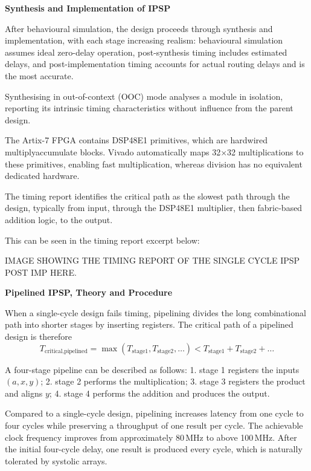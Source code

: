 \documentclass[a4paper,12pt]{article}
\begin{document}
\textbf{Synthesis and Implementation of IPSP}

After behavioural simulation, the design proceeds through synthesis and implementation, with each stage increasing realism: behavioural simulation assumes ideal zero-delay operation, post-synthesis timing includes estimated delays, and post-implementation timing accounts for actual routing delays and is the most accurate.

Synthesising in out-of-context (OOC) mode analyses a module in isolation, reporting its intrinsic timing characteristics without influence from the parent design.

The Artix-7 FPGA contains DSP48E1 primitives, which are hardwired multiply\-accumulate blocks. Vivado automatically maps 32$\times$32 multiplications to these primitives, enabling fast multiplication, whereas division has no equivalent dedicated hardware.

The timing report identifies the critical path as the slowest path through the design, typically from input, through the DSP48E1 multiplier, then fabric-based addition logic, to the output.

This can be seen in the timing report excerpt below:

\begin{large}
    IMAGE SHOWING THE TIMING REPORT OF THE SINGLE CYCLE IPSP POST IMP HERE.
\end{large}

\textbf{Pipelined IPSP, Theory and Procedure}

When a single-cycle design fails timing, pipelining divides the long combinational path into shorter stages by inserting registers. The critical path of a pipelined design is therefore
\begin{equation}
T_{\text{critical,pipelined}} = \max(T_{\text{stage1}}, T_{\text{stage2}}, \ldots) 
< T_{\text{stage1}} + T_{\text{stage2}} + \ldots
\end{equation}

A four-stage pipeline can be described as follows: 
1. stage 1 registers the inputs $(a, x, y)$; 
2. stage 2 performs the multiplication; 
3. stage 3 registers the product and aligns $y$; 
4. stage 4 performs the addition and produces the output.

Compared to a single-cycle design, pipelining increases latency from one cycle to four cycles while preserving a throughput of one result per cycle. The achievable clock frequency improves from approximately 80\,MHz to above 100\,MHz. After the initial four-cycle delay, one result is produced every cycle, which is naturally tolerated by systolic arrays.
\end{document}
